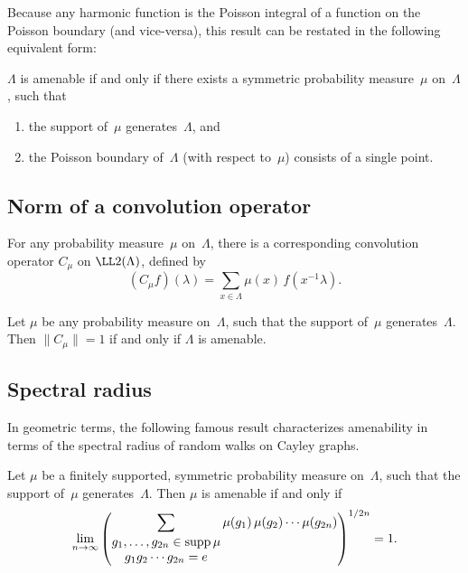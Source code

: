Because any harmonic function is the Poisson integral of a function on the Poisson boundary (and vice-versa), this result can be restated in the following equivalent form:

\begin{cor}
$\Lambda$ is amenable if and only if there exists a symmetric probability measure~$\mu$ on~$\Lambda$, such that
\noprelistbreak
	\begin{enumerate}
	\item the support of~$\mu$ generates~$\Lambda$,
	and
	\item the Poisson boundary of~$\Lambda$ {\rm(}with respect to~$\mu${\rm)} consists of a single point.
	\end{enumerate}
\end{cor}




\subsection{Norm of a convolution operator}

\begin{defn}
For any probability measure~$\mu$ on~$\Lambda$, there is a corresponding convolution operator $C_\mu$ on $\LL2(\Lambda)$, defined by
	$$ (C_\mu f )(\lambda) = \sum_{x \in \Lambda} \mu(x) \, f(x^{-1} \lambda) .$$
\end{defn}

\begin{thm} \label{Amen<>ConvOp} 
Let $\mu$ be any probability measure on~$\Lambda$, such that the support of~$\mu$ generates~$\Lambda$. Then $\| C_\mu \| = 1$ if and only if $\Lambda$ is amenable.
\end{thm}



\subsection{Spectral radius}

In geometric terms, the following famous result characterizes amenability in terms of the spectral radius of random walks on Cayley graphs.

\begin{thm}[(Kesten)]
Let $\mu$ be a finitely supported, symmetric probability measure on~$\Lambda$, such that the support of~$\mu$ generates~$\Lambda$. Then $\mu$ is amenable if and only if
	$$ \lim_{n \to \infty} \left( 
	\raise13pt\hbox{$\displaystyle %
	 \sum_{\begin{matrix}
	g_1,\ldots,g_{2n} \in \mathop{\mathrm{supp}} \mu
	\\
	g_1g_2 \cdots g_{2n} = e
	\end{matrix}}
	\mu(g_1) \, \mu(g_2) \cdots \mu(g_{2n}) 
	$}
	\right)^{1/2n} = 1
	. $$
\end{thm}




